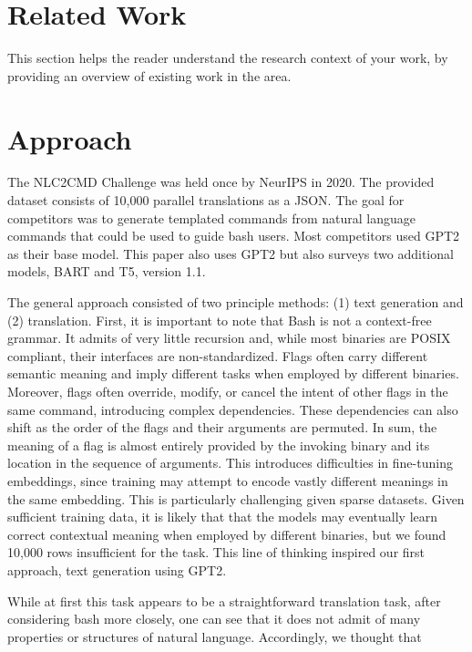 \documentclass{article}
\begin{document}
\section{Related Work}
This section helps the reader understand the research context of your work, by providing an overview of existing work in the area.

\color{red}
\section{Approach}
\color{black}
The NLC2CMD Challenge was held once by NeurIPS in 2020. The provided dataset
consists of 10,000 parallel translations as a JSON. The goal for competitors
was to generate templated commands from natural language commands that could be
used to guide bash users. Most competitors used GPT2 as their base model. This
paper also uses GPT2 but also surveys two additional models, BART and T5,
version 1.1.
\par
The general approach consisted of two principle methods: (1) text generation
and (2) translation. First, it is important to note that Bash is not a
context-free grammar. It admits of very little recursion and, while most
binaries are POSIX compliant, their interfaces are non-standardized. Flags
often carry different semantic meaning and imply different tasks when employed
by different binaries. Moreover, flags often override, modify, or cancel the
intent of other flags in the same command, introducing complex dependencies.
These dependencies can also shift as the order of the flags and their arguments
are permuted. In sum, the meaning of a flag is almost entirely provided by the
invoking binary and its location in the sequence of arguments. This introduces
difficulties in fine-tuning embeddings, since training may attempt to encode
vastly different meanings in the same embedding. This is particularly
challenging given sparse datasets. Given sufficient training data, it is likely
that that the models may eventually learn correct contextual meaning when
employed by different binaries, but we found 10,000 rows insufficient for the
task. This line of thinking inspired our first approach, text generation using
GPT2.
\par
While at first this task appears to be a straightforward translation task,
after considering bash more closely, one can see that it does not admit of many
properties or structures of natural language. Accordingly, we thought that
\end{document}
